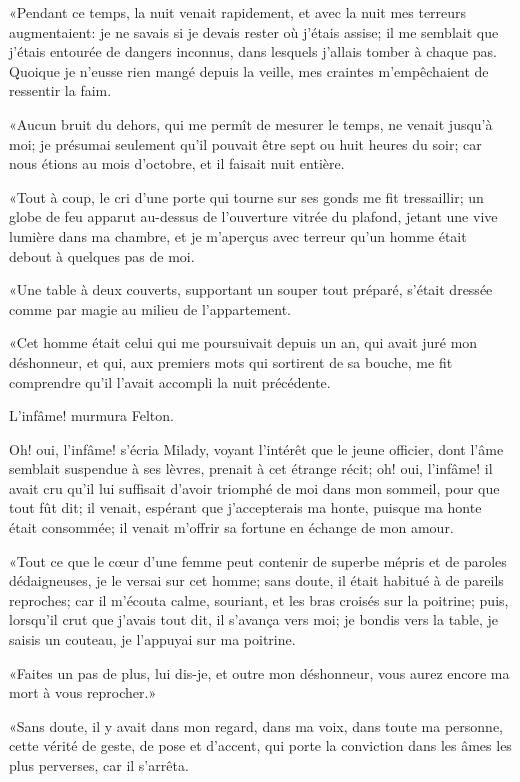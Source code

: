 «Pendant ce temps, la nuit venait rapidement, et avec la nuit mes terreurs augmentaient: je ne savais si je devais rester où j'étais assise; il me semblait que j'étais entourée de dangers inconnus, dans lesquels j'allais tomber à chaque pas. Quoique je n'eusse rien mangé depuis la veille, mes craintes m'empêchaient de ressentir la faim. 

«Aucun bruit du dehors, qui me permît de mesurer le temps, ne venait jusqu'à moi; je présumai seulement qu'il pouvait être sept ou huit heures du soir; car nous étions au mois d'octobre, et il faisait nuit entière. 

«Tout à coup, le cri d'une porte qui tourne sur ses gonds me fit tressaillir; un globe de feu apparut au-dessus de l'ouverture vitrée du plafond, jetant une vive lumière dans ma chambre, et je m'aperçus avec terreur qu'un homme était debout à quelques pas de moi. 

«Une table à deux couverts, supportant un souper tout préparé, s'était dressée comme par magie au milieu de l'appartement. 

«Cet homme était celui qui me poursuivait depuis un an, qui avait juré mon déshonneur, et qui, aux premiers mots qui sortirent de sa bouche, me fit comprendre qu'il l'avait accompli la nuit précédente. 

\speak  L'infâme! murmura Felton. 

\speak  Oh! oui, l'infâme! s'écria Milady, voyant l'intérêt que le jeune officier, dont l'âme semblait suspendue à ses lèvres, prenait à cet étrange récit; oh! oui, l'infâme! il avait cru qu'il lui suffisait d'avoir triomphé de moi dans mon sommeil, pour que tout fût dit; il venait, espérant que j'accepterais ma honte, puisque ma honte était consommée; il venait m'offrir sa fortune en échange de mon amour. 

«Tout ce que le cœur d'une femme peut contenir de superbe mépris et de paroles dédaigneuses, je le versai sur cet homme; sans doute, il était habitué à de pareils reproches; car il m'écouta calme, souriant, et les bras croisés sur la poitrine; puis, lorsqu'il crut que j'avais tout dit, il s'avança vers moi; je bondis vers la table, je saisis un couteau, je l'appuyai sur ma poitrine. 

«Faites un pas de plus, lui dis-je, et outre mon déshonneur, vous aurez encore ma mort à vous reprocher.» 

«Sans doute, il y avait dans mon regard, dans ma voix, dans toute ma personne, cette vérité de geste, de pose et d'accent, qui porte la conviction dans les âmes les plus perverses, car il s'arrêta. 

